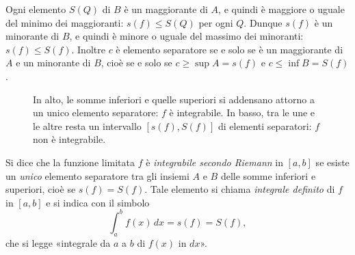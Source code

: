 \begin{dimostrazione}
Ogni elemento $S(Q)$ di $B$ è un maggiorante di $A$, e quindi è maggiore o uguale del
minimo dei maggioranti: $s(f)\le S(Q)$ per ogni $Q$. Dunque $s(f)$ è un minorante di $B$,
e quindi è minore o uguale del massimo dei minoranti: $s(f)\le S(f)$. Inoltre $c$ è
elemento separatore se e solo se è un maggiorante di $A$ e un minorante di $B$, cioè se
e solo se $c\ge\sup A=s(f)$ e $c\le\inf B=S(f)$.
\end{dimostrazione}

\begin{figure}[htb]
\centering
{}
\caption{In alto, le somme inferiori e quelle superiori si addensano attorno a un unico
elemento separatore: $f$ è integrabile. In basso, tra le une e le altre resta un
intervallo $[s(f),S(f)]$ di elementi separatori: $f$ non è integrabile.}
\label{fig:separatori}
\end{figure}

\begin{definizione}\label{def:integrale}
Si dice che la funzione limitata $f$ è \emph{integrabile secondo Riemann} in $[a,b]$ se
esiste un \emph{unico} elemento separatore tra gli insiemi $A$ e $B$ delle somme
inferiori e superiori, cioè se $s(f)=S(f)$. Tale elemento si chiama \emph{integrale
definito} di $f$ in $[a,b]$ e si indica con il simbolo
\begin{equation}\label{eq:integrale}
  \int_{a}^{b}f(x)\,dx=s(f)=S(f) ,
\end{equation}
che si legge «integrale da $a$ a $b$ di $f(x)$ in $dx$».
\end{definizione}

